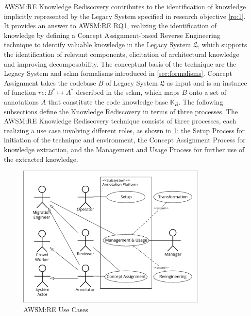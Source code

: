 AWSM:RE Knowledge Rediscovery contributes to the identification of knowledge implicitly represented by the \gls{Legacy System} specified in research objective \cref{ro:1}.
It provides an answer to AWSM:RE RQ1, realizing the identification of knowledge by defining a \gls{Concept Assignment}-based \gls{Reverse Engineering} technique to identify valuable knowledge in the \gls{Legacy System} \(\mathfrak L\), which supports the identification of relevant components, elicitation of architectural knowledge and improving decomposability.
The conceptual basis of the technique are the \gls{Legacy System} and \gls{sckm} formalisms introduced in \cref{sec:formalisms}.
\gls{Concept Assignment} takes the codebase \(B\) of \gls{Legacy System} \(\mathfrak{L}\) as input and is an instance of function \(re: B^* \mapsto A^*\) described in the \gls{sckm}, which maps \(B\) onto a set of annotations \(A\) that constitute the  code knowledge base \(\mathbb{K}_{B}\).
The following subsections define the Knowledge Rediscovery in terms of three processes.
%
The AWSM:RE Knowledge Rediscovery technique consists of three processes, each realizing a use case involving different roles, as shown in \cref{fig:awsm.re.use-cases}: the Setup Process for initiation of the technique and environment, the \gls{Concept Assignment} Process for knowledge extraction, and the Management and Usage Process for further use of the extracted knowledge.

\begin{figure}[hbt]
\hypertarget{fig:awsm.re.use-cases}{%
\centering
\includegraphics[width=0.85\textwidth]{../figures/awsm-re-use-cases.pdf}
\caption{AWSM:RE Use Cases}\label{fig:awsm.re.use-cases}
}
\end{figure}

